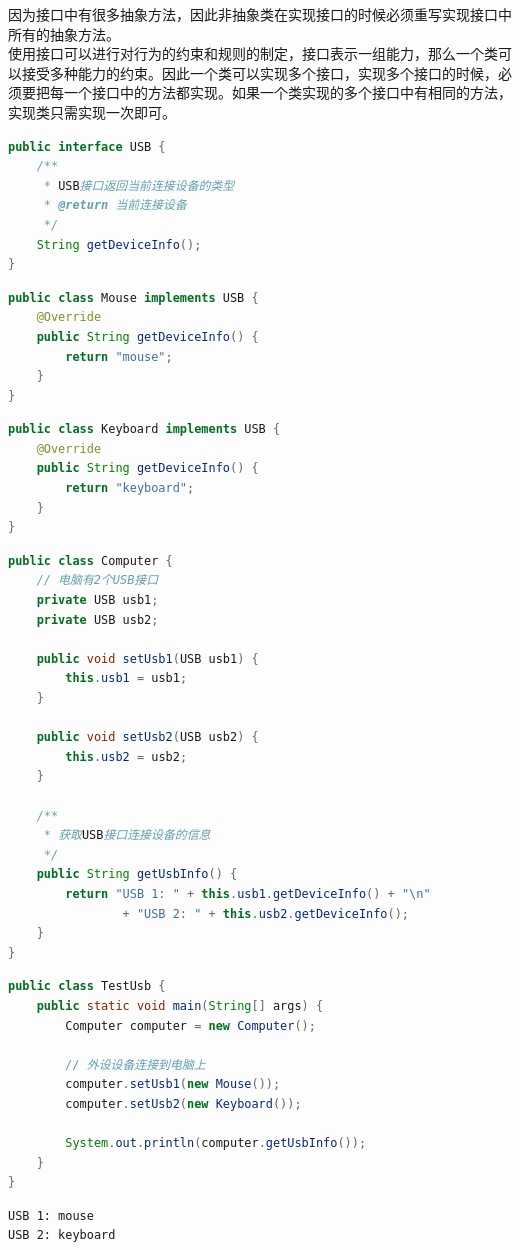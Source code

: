 因为接口中有很多抽象方法，因此非抽象类在实现接口的时候必须重写实现接口中所有的抽象方法。\\

使用接口可以进行对行为的约束和规则的制定，接口表示一组能力，那么一个类可以接受多种能力的约束。因此一个类可以实现多个接口，实现多个接口的时候，必须要把每一个接口中的方法都实现。如果一个类实现的多个接口中有相同的方法，实现类只需实现一次即可。\\


\begin{lstlisting}[language=Java, title=USB.java]
public interface USB {
    /**
     * USB接口返回当前连接设备的类型
     * @return 当前连接设备
     */
    String getDeviceInfo();
}
\end{lstlisting}

\begin{lstlisting}[language=Java, title=Mouse.java]
public class Mouse implements USB {
    @Override
    public String getDeviceInfo() {
        return "mouse";
    }
}
\end{lstlisting}

\begin{lstlisting}[language=Java, title=Keyboard.java]
public class Keyboard implements USB {
    @Override
    public String getDeviceInfo() {
        return "keyboard";
    }
}
\end{lstlisting}

\begin{lstlisting}[language=Java, title=Computer.java]
public class Computer {
    // 电脑有2个USB接口
    private USB usb1;
    private USB usb2;
    
    public void setUsb1(USB usb1) {
        this.usb1 = usb1;
    }
    
    public void setUsb2(USB usb2) {
        this.usb2 = usb2;
    }
    
    /**
     * 获取USB接口连接设备的信息
     */
    public String getUsbInfo() {
        return "USB 1: " + this.usb1.getDeviceInfo() + "\n"
                + "USB 2: " + this.usb2.getDeviceInfo();
    }
}
\end{lstlisting}

\begin{lstlisting}[language=Java, title=TestUsb.java]
public class TestUsb {
    public static void main(String[] args) {
        Computer computer = new Computer();
        
        // 外设设备连接到电脑上
        computer.setUsb1(new Mouse());
        computer.setUsb2(new Keyboard());
        
        System.out.println(computer.getUsbInfo());
    }
}
\end{lstlisting}

\begin{tcolorbox}
	\begin{verbatim}
USB 1: mouse
USB 2: keyboard
	\end{verbatim}
\end{tcolorbox}

\newpage
